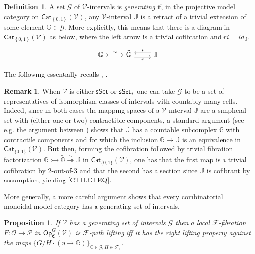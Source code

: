 \documentclass[a4paper,10pt
 ,final
]{article}%
\numberwithin{equation}{section}
\numberwithin{figure}{section}
\newtheorem{proposition}[equation]{Proposition}%
\theoremstyle{definition} %
\newtheorem{definition}[equation]{Definition}%
\newtheorem{remark}[equation]{Remark}%
\newcommand{\set}[1]{\left\{#1\right\}}%
\newcommand{\Cat}{\mathsf{Cat}}
\newcommand{\F}{\ensuremath{\mathcal F}}
\newcommand{\V}{\ensuremath{\mathcal V}}
\renewcommand{\O}{\ensuremath{\mathcal O}}
\renewcommand{\P}{\ensuremath{\mathcal P}}
\newcommand{\1}{\ensuremath{\mathbbm 1}}%
\begin{document}
\begin{definition}\label{INTGENSET DEF}
	A set $\mathscr{G}$ of $\V$-intervals is \textit{generating} if,
	in the projective model category on $\Cat_{\set{0,1}}(\V)$,
	any $\V$-interval $\mathbb{J}$ is
	a retract of a trivial extension of some element
	$\mathbb{G} \in \mathscr{G}$.
	More explicitly, this means that there is a diagram in 
	$\Cat_{\set{0,1}}(\V)$ as below,
	where the left arrow is a trivial cofibration and
	$ri = id_{\mathbb{J}}$.
\begin{equation}\label{GTILGI EQ}
	\begin{tikzcd}
		\mathbb{G} \arrow[r,rightarrowtail, "\sim"]
	&
		\widetilde{\mathbb{G}} \arrow[r,yshift=-.3em, "r"']
	&
		\mathbb{J} \arrow[l,yshift=.3em, "i"']
	\end{tikzcd}
\end{equation}
\end{definition}


The following essentially recalls \cite[1.20]{CM13b}, \cite[\S 4.3]{Cav}.


\begin{remark}
      \label{SSETINT_REM}
When $\V$ is either $\mathsf{sSet}$ or $\mathsf{sSet}_{\**}$
one can take $\mathscr{G}$ to be a set of representatives of isomorphism classes of intervals with countably many cells.
Indeed, since in both cases the mapping spaces of a $\V$-interval
$\mathbb{J}$ are a simplicial set with (either one or two) contractible components,
a standard argument (see e.g. the argument between \cite[Lemmas 4.2,4.3]{Ber07b})
shows that $\mathbb{J}$ has a countable subcomplex $\mathbb{G}$ with contractile components and
for which the inclusion 
$\mathbb{G} \to \mathbb{J}$
is an equivalence in $\mathsf{Cat}_{\{0,1\}}(\V)$.
But then, forming the cofibration followed by trivial fibration factorization
$\mathbb{G} \rightarrowtail \widetilde{\mathbb{G}}
\overset{\sim}{\twoheadrightarrow} \mathbb{J}$
in $\mathsf{Cat}_{\{0,1\}}(\V)$,
one has that the first map is a trivial cofibration by $2$-out-of-$3$
and that the second has a section since $\mathbb{J}$ is cofibrant by assumption, yielding \eqref{GTILGI EQ}.

More generally, a more careful argument \cite[Lemma 1.12]{BM13}
shows that every combinatorial monoidal model category
has a generating set of intervals.
\end{remark}



\begin{proposition}\label{GENIN PROP}
If $\V$ has a generating set of intervals $\mathscr{G}$ then a local $\F$-fibration 
$F \colon \O \to \P$ in 
$\mathsf{Op}^G_{\mathfrak{C}}(\V)$
is $\F$-path lifting iff it has the right lifting property against the maps 
$\{G/H \cdot (\eta \to \mathbb{G})\}_{\mathbb{G}\in \mathscr{G},H \in \mathcal{F}_1}$.
\end{proposition}
\end{document}
